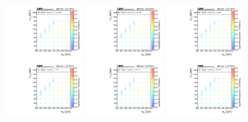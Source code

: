 \clearpage
\begin{figure}
    \begin{center}
            \includegraphics[width=0.30\textwidth]{Supplementary/T1qqqqLL_ctau_0p001_efficiency_aux}
            \includegraphics[width=0.30\textwidth]{Supplementary/T1qqqqLL_ctau_0p01_efficiency_aux}
            \includegraphics[width=0.30\textwidth]{Supplementary/T1qqqqLL_ctau_0p1_efficiency_aux}
            \includegraphics[width=0.30\textwidth]{Supplementary/T1qqqqLL_ctau_1_efficiency_aux}
            \includegraphics[width=0.30\textwidth]{Supplementary/T1qqqqLL_ctau_10_efficiency_aux}
            \includegraphics[width=0.30\textwidth]{Supplementary/T1qqqqLL_ctau_100_efficiency_aux}

\end{center}
\end{figure}
